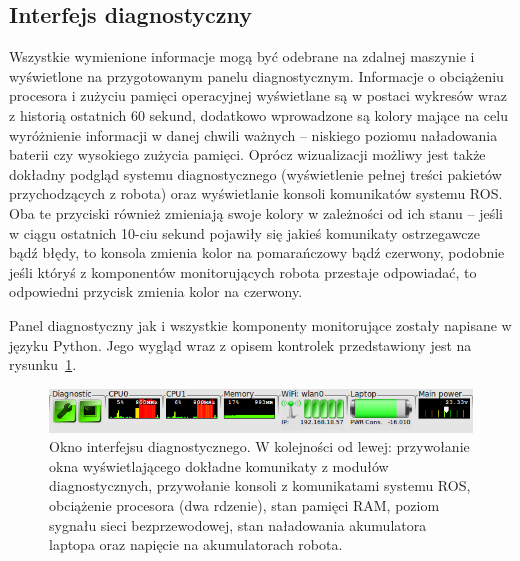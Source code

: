 \subsection{Interfejs diagnostyczny}

Wszystkie wymienione informacje mogą być odebrane na zdalnej maszynie i
wyświetlone na przygotowanym panelu diagnostycznym. Informacje o obciążeniu
procesora i zużyciu pamięci operacyjnej wyświetlane są w postaci wykresów
wraz z historią ostatnich 60 sekund, dodatkowo wprowadzone są kolory mające
na celu wyróżnienie informacji w danej chwili ważnych -- niskiego poziomu
naładowania baterii czy wysokiego zużycia pamięci. Oprócz wizualizacji
możliwy jest także dokładny podgląd systemu diagnostycznego (wyświetlenie
pełnej treści pakietów przychodzących z robota) oraz wyświetlanie konsoli
komunikatów systemu ROS. Oba te przyciski również zmieniają swoje kolory
w zależności od ich stanu -- jeśli w ciągu ostatnich 10-ciu sekund pojawiły
się jakieś komunikaty ostrzegawcze bądź błędy, to konsola zmienia kolor na
pomarańczowy bądź czerwony, podobnie jeśli któryś z komponentów monitorujących
robota przestaje odpowiadać, to odpowiedni przycisk zmienia kolor na czerwony.

Panel diagnostyczny jak i wszystkie komponenty monitorujące zostały napisane w
języku Python. Jego wygląd wraz z opisem kontrolek przedstawiony jest na
rysunku~\ref{fig:elektron_dashboard}.

\begin{figure}[htb!]
\centering
\includegraphics[width=13cm]{../../Common/img/ros/elektron_dashboard}
\caption[Okno interfejsu diagnostycznego]{Okno interfejsu diagnostycznego. W
kolejności od lewej: przywołanie okna wyświetlającego dokładne komunikaty z modułów diagnostycznych, przywołanie
konsoli z komunikatami systemu ROS, obciążenie procesora (dwa rdzenie), stan
pamięci RAM, poziom sygnału sieci bezprzewodowej, stan naładowania akumulatora
laptopa oraz napięcie na akumulatorach robota.}
\label{fig:elektron_dashboard}
\end{figure}
